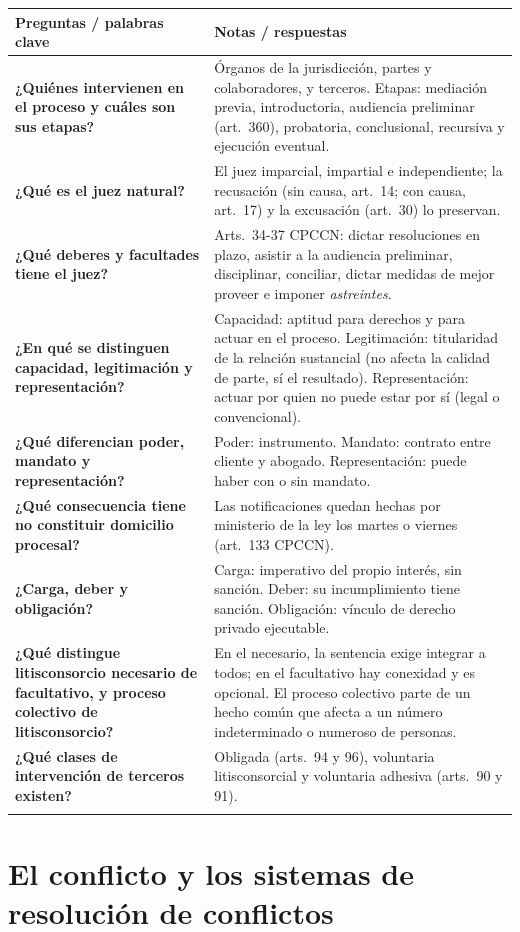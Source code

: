 \documentclass[12pt,oneside]{book}
\newenvironment{cornell}[1]{%
  \par\medskip\noindent{\small\bfseries Cuadro Cornell: #1}\par\smallskip
  \begin{longtable}{|>{\RaggedRight\arraybackslash}p{0.27\textwidth}|>{\RaggedRight\arraybackslash}p{0.66\textwidth}|}
  \hline
  \textbf{\small Preguntas / palabras clave} & \textbf{\small Notas / respuestas} \\ \hline\endhead
}{\end{longtable}\par\medskip}
\newcommand{\cqa}[2]{\textbf{#1} & #2 \\ \hline}
\newcommand{\cornellsummary}[1]{\multicolumn{2}{|p{0.95\textwidth}|}{\textbf{Resumen:} #1} \\ \hline}
\begin{document}
\begin{cornell}{sujetos del proceso}
\cqa{¿Quiénes intervienen en el proceso y cuáles son sus etapas?}{Órganos de la jurisdicción, partes y colaboradores, y terceros. Etapas: mediación previa, introductoria, audiencia preliminar (art.~360), probatoria, conclusional, recursiva y ejecución eventual.}
\cqa{¿Qué es el juez natural?}{El juez imparcial, impartial e independiente; la recusación (sin causa, art.~14; con causa, art.~17) y la excusación (art.~30) lo preservan.}
\cqa{¿Qué deberes y facultades tiene el juez?}{Arts.~34-37 CPCCN: dictar resoluciones en plazo, asistir a la audiencia preliminar, disciplinar, conciliar, dictar medidas de mejor proveer e imponer \textit{astreintes}.}
\cqa{¿En qué se distinguen capacidad, legitimación y representación?}{Capacidad: aptitud para derechos y para actuar en el proceso. Legitimación: titularidad de la relación sustancial (no afecta la calidad de parte, sí el resultado). Representación: actuar por quien no puede estar por sí (legal o convencional).}
\cqa{¿Qué diferencian poder, mandato y representación?}{Poder: instrumento. Mandato: contrato entre cliente y abogado. Representación: puede haber con o sin mandato.}
\cqa{¿Qué consecuencia tiene no constituir domicilio procesal?}{Las notificaciones quedan hechas por ministerio de la ley los martes o viernes (art.~133 CPCCN).}
\cqa{¿Carga, deber y obligación?}{Carga: imperativo del propio interés, sin sanción. Deber: su incumplimiento tiene sanción. Obligación: vínculo de derecho privado ejecutable.}
\cqa{¿Qué distingue litisconsorcio necesario de facultativo, y proceso colectivo de litisconsorcio?}{En el necesario, la sentencia exige integrar a todos; en el facultativo hay conexidad y es opcional. El proceso colectivo parte de un hecho común que afecta a un número indeterminado o numeroso de personas.}
\cqa{¿Qué clases de intervención de terceros existen?}{Obligada (arts.~94 y 96), voluntaria litisconsorcial y voluntaria adhesiva (arts.~90 y 91).}
\cornellsummary{El proceso es un sistema de actos en que intervienen el juez y sus auxiliares, las partes con sus representantes y colaboradores, y los terceros con interés propio. El Código regula recusación, deberes judiciales, legitimación, domicilios, cargas, litisconsorcio y terceros, bajo los sistemas de preclusión y dispositivo.}
\end{cornell}
\chapter{El conflicto y los sistemas de resolución de conflictos}
\label{cap:adr}
\end{document}
